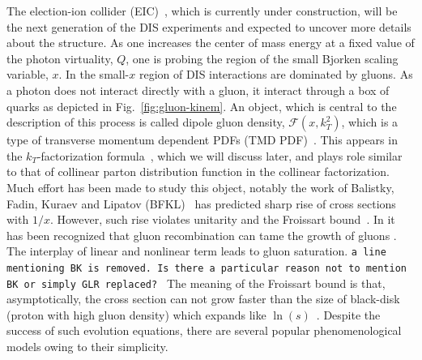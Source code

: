 \documentclass[11pt]{article}
\numberwithin{equation}{section}
\numberwithin{table}{section}
\numberwithin{figure}{section}
\newcommand{\comment}[1]{\texttt{\color{red}#1}}
\begin{document}
The election-ion collider (EIC)~\cite{NAP25171}, which is currently under construction, will be the next generation of the DIS experiments and expected to uncover more details about the structure.  
As one increases the center of mass energy at a fixed value of the photon virtuality, $Q$, one is probing the region of the small Bjorken scaling variable, $x$.
In the small-$x$ region of DIS %
%
interactions are dominated by gluons\cite{Kovchegov:2012mbw}. As a photon does not interact directly with a gluon, it interact through a box of quarks as depicted in Fig.~\ref{fig:gluon-kinem}. 
An object, which is central to the description of this process is called dipole gluon density, $\mathcal{F}(x,k_T^2)$, which is a type of transverse momentum dependent PDFs (TMD PDF)~\cite{Dominguez:2010xd,Dominguez:2011wm,Xiao:2017yya}. This appears in the $k_T$-factorization formula~\cite{Dominguez:2010xd,Dominguez:2011wm,Xiao:2017yya}, which we will discuss later, and plays role similar to that of collinear parton distribution function in the collinear factorization.
Much effort has been made to study this object, notably the work of Balistky, Fadin, Kuraev and Lipatov (BFKL)~\cite{Balitsky:1978ic, Kuraev:1977fs} has predicted sharp rise of cross sections with $1/x$.  However, such rise violates unitarity and the Froissart bound~\cite{Kovchegov:2012mbw,Barone:1993sy}. In \cite{Gribov:1983ivg} it has been recognized that gluon recombination can tame the growth of gluons \cite{Gribov:1983ivg}. The interplay of linear and nonlinear term leads to gluon saturation. \comment{a line mentioning BK is removed. Is there a particular reason not to mention BK or simply GLR replaced? }%
 The meaning of the Froissart bound is that, asymptotically, the cross section can not grow faster than the size of black-disk (proton with high gluon density) which expands like $\ln(s)$~\cite{Badelek:1992gs}.
Despite the success of such evolution equations, there are several popular phenomenological models owing to their simplicity. 
\end{document}
